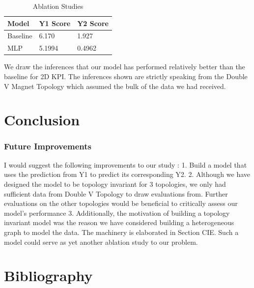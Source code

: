 \documentclass{report} %
\begin{document}
\begin{table}[H]
    \centering
    \begin{tabularx}{1\linewidth}{|X|X|X|}
    \hline {\bf Model} & {\bf Y1 Score} & {\bf Y2 Score}\\
    \hline 
    Baseline & 6.170 & 1.927 \\
    MLP & 5.1994 & 0.4962 \\
    \hline
    \end{tabularx}
    \caption{Ablation Studies}
\end{table}

We draw the inferences that our model has performed relatively better than the baseline for 2D KPI.
The inferences shown are strictly speaking from the Double V Magnet Topology which assumed the bulk of the data we had received.
\newpage 

\chapter*{Conclusion}


\subsection*{Future Improvements}

I would suggest the following improvements to our study :
1. Build a model that uses the prediction from Y1 to predict its corresponding Y2. 
2. Although we have designed the model to be topology invariant for 3 topologies, we only had sufficient data from Double V Topology to draw evaluations from.
Further evaluations on the other topologies would be beneficial to critically assess our model's performance
3. Additionally, the motivation of building a topology invariant model was the reason we have considered building a heterogeneous graph to model the data. The machinery is elaborated in Section CIE.
Such a model could serve as yet another ablation study to our problem.


\newpage 

\newpage 

\listoffigures

\newpage 

\newpage 

\listoftables

\newpage 

\newpage 

\chapter*{Bibliography}
\newpage 
\end{document}
